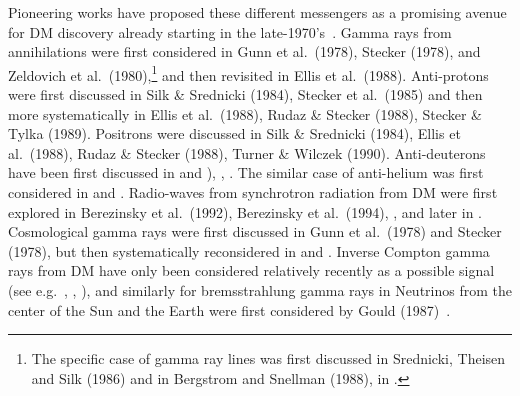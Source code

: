 Pioneering works have proposed these different messengers as a promising avenue for DM discovery already starting in the late-1970's~\cite{PioneersDMID}. 
Gamma rays from annihilations were first considered in Gunn et al.~(1978), Stecker (1978), and Zeldovich et al.~(1980),\footnote{The specific case of gamma ray lines was first discussed in Srednicki, Theisen and Silk (1986) and in Bergstrom and Snellman (1988), in \cite{sharpfeatures}.} and then revisited in Ellis et al.~(1988). 
Anti-protons were first discussed in Silk \& Srednicki (1984), Stecker et al.~(1985) and then more systematically in Ellis et al.~(1988), Rudaz \& Stecker (1988), Stecker \& Tylka (1989). 
Positrons were discussed in Silk \& Srednicki (1984), Ellis et al.~(1988), Rudaz \& Stecker (1988), Turner \& Wilczek (1990). 
Anti-deuterons have been first discussed in  and ), , 
.
The similar case of anti-helium was first considered in  and . 
Radio-waves from synchrotron radiation from DM were first explored in Berezinsky et al.~(1992), Berezinsky et al.~(1994), ,  and later in . 
Cosmological gamma rays were first discussed in Gunn et al.~(1978) and Stecker (1978), but then systematically reconsidered in  and . 
Inverse Compton gamma rays from DM have only been  considered relatively recently as a possible signal 
(see e.g.\ , , ), 
and similarly for bremsstrahlung gamma rays in   
Neutrinos from the center of the Sun and the Earth were first considered by Gould (1987)~\cite{DMnu}.

\medskip


